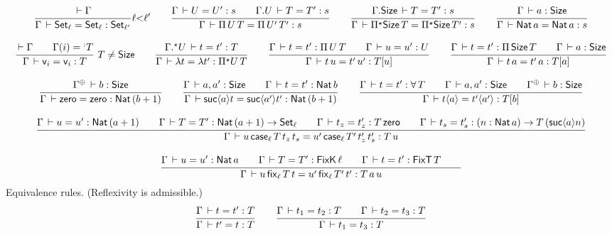\documentclass[acmlarge,review,anonymous]{acmart}\settopmatter{printfolios=true}
\begin{document}
\begin{gather*}
  \ru{\der \Gamma
    }{\Gamma \der \Set[\ell] = \Set[\ell]: \Set[\ell']
    }{\ell {<} \ell'}
\qquad
  \ru{\Gamma \der U = U' : s \qquad
      \cext \Gamma U \der T = T' : s
    }{\Gamma \der \piT U T = \piT{U'}T': s}
\qquad
  \ru{\cext \Gamma \Size \der T = T' : s
    }{\Gamma \der \epiT \Size T = \epiT \Size T' : s}
\qquad
  \ru{%
      \Gamma \der a : \Size
    }{\Gamma \der \Nat a = \Nat a : s}
\\[2ex]
  \rux{\der \Gamma \qquad \Gamma(i) = \erann[\noterased] T
    }{\Gamma \der \ind i = \ind i : T
    }{T \not= \Size}
\qquad
  \ru{\eext \Gamma U \der t = t' : T
    }{\Gamma \der \lambda t = \lambda t' : \epiT U T}
\qquad
  \ru{\Gamma \der t = t' : \piT U T \qquad
      \Gamma \der u = u' : U
    }{\Gamma \der t\,u = t'\,u' : T[u]}
\qquad
  \ru{\Gamma \der t = t' : \piT \Size T \qquad
      \Gamma \der a : \Size
    }{\Gamma \der t\,a = t'\,a : T[a]}
\\[2ex] %
  \ru{\resurrect\Gamma \der b : \Size
    }{\Gamma \der \tzero = \tzero : \Nat (b + 1)}
\qquad
  \ru{\Gamma \der a, a' : \Size \qquad
      \Gamma \der t = t' : \Nat b
    }{\Gamma \der \suc a t = \suc {a'} t' : \Nat (b + 1)}
\qquad
  \ru{\Gamma \der t = t' : \forallT T \qquad
      \Gamma \der a, a' : \Size \qquad
      \resurrect\Gamma \der b : \Size
    }{\Gamma \der t \ann a = t' \ann{a'} : T[b]}
\\[2ex]
  \ru{\Gamma \der u = u' : \Nat (a + 1) \qquad
      \Gamma \der T = T' : \Nat (a + 1) \to \Set[\ell] \qquad
      \Gamma \der t_z = t_z' : T \, \tzero \qquad
      \Gamma \der t_s = t_s' : (n : \Nat a) \to T \, (\suc a n)
    }{\Gamma \der u\,\case[\ell] T {t_z} t_s = u'\,\case[\ell] {T'} {t_z'} t_s' : T \, u}
\\[2ex]
  \ru{\Gamma \der u = u' : \Nat a \qquad
      \Gamma \der T = T' : \FixK\,\ell \qquad %
      \Gamma \der t = t' : \FixT\,T \qquad %
     }{\Gamma \der u\,\fix[\ell] T t = u'\,\fix[\ell] {T'} t' : T \, a \, u}
\end{gather*}
Equivalence rules.  (Reflexivity is admissible.)
\begin{gather*}
  \ru{\Gamma \der t = t' : T
    }{\Gamma \der t' = t : T}
\qquad
  \ru{\Gamma \der t_1 = t_2 : T \qquad
      \Gamma \der t_2 = t_3 : T
    }{\Gamma \der t_1 = t_3 : T}
\end{gather*}
\end{document}
